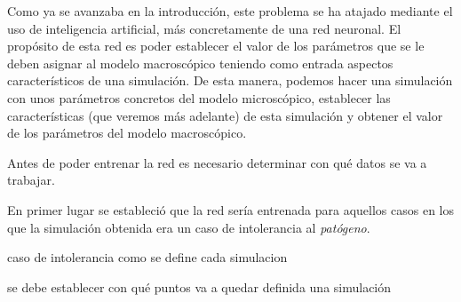 Como ya se avanzaba en la introducción, este problema se ha atajado mediante el uso de inteligencia artificial, más concretamente de una red neuronal. El propósito de esta red es poder establecer el valor de los parámetros que se le deben asignar al modelo macroscópico teniendo como entrada aspectos característicos de una simulación. De esta manera, podemos hacer una simulación con unos parámetros concretos del modelo microscópico, establecer las características (que veremos más adelante) de esta simulación y obtener el valor de los parámetros del modelo macroscópico. 

Antes de poder entrenar la red es necesario determinar con qué datos se va a trabajar.

 En primer lugar se estableció que la red sería entrenada para aquellos casos en los que la simulación obtenida era un caso de intolerancia al \textit{patógeno}. 

caso de intolerancia
como se define cada simulacion

se debe establecer con qué puntos va a quedar definida una simulación





















